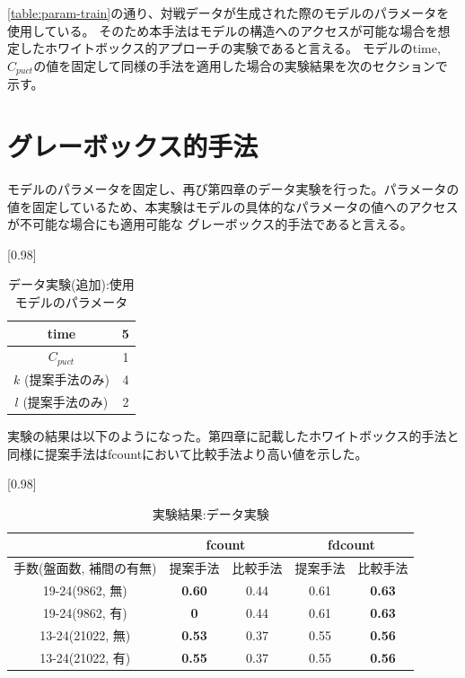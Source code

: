 \ref{table:param-train}の通り、対戦データが生成された際のモデルのパラメータを使用している。
そのため本手法はモデルの構造へのアクセスが可能な場合を想定したホワイトボックス的アプローチの実験であると言える。
モデルのtime, $C_{puct}$の値を固定して同様の手法を適用した場合の実験結果を次のセクションで示す。
\section{グレーボックス的手法}
モデルのパラメータを固定し、再び第四章のデータ実験を行った。パラメータの値を固定しているため、本実験はモデルの具体的なパラメータの値へのアクセスが不可能な場合にも適用可能な
グレーボックス的手法であると言える。
\begin{table}[H]
	\caption{データ実験(追加):使用モデルのパラメータ}
	\centering
	\scalebox{0.98}[0.98]{
		\begin{tabular}{c|c}
			
			time    & 5 \\ \hline
			$C_{puct}$    & 1 \\
			$k$ (提案手法のみ)     & 4 \\
			$l$ (提案手法のみ)     & 2 \\
		\end{tabular}
	}
	\label{table:param-data-extra}
\end{table}

実験の結果は以下のようになった。第四章に記載したホワイトボックス的手法と同様に提案手法はfcountにおいて比較手法より高い値を示した。
\begin{table}[H]
	\caption{実験結果:データ実験}
	\centering
	\scalebox{0.98}[0.98]{
		\begin{tabular}{c|c|c|c|c}
			\multicolumn{1}{c}{} & \multicolumn{2}{|c|}{fcount} 
			& \multicolumn{2}{c|}{fdcount}\\ \hline \hline
			手数(盤面数, 補間の有無)    & 提案手法 & 比較手法 & 提案手法 & 比較手法 \\ \hline
			19-24(9862, 無)    & \bf{0.60} & 0.44 & 0.61 & \bf{0.63} \\
			19-24(9862, 有)    & \bf{0} & 0.44 & 0.61 & \bf{0.63}  \\
			13-24(21022, 無)   & \bf{0.53} & 0.37 & 0.55 & \bf{0.56}  \\
			13-24(21022, 有)   & \bf{0.55} & 0.37 & 0.55 & \bf{0.56}  \\
		\end{tabular}
	}
	\label{table:result-online}
\end{table}
